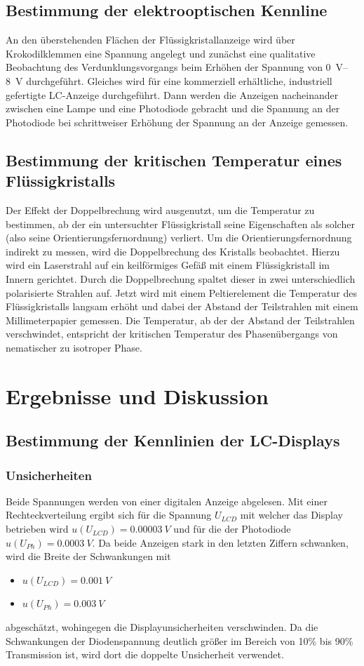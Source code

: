 \documentclass[
	a4paper,
	12pt,
	pagesize,
	ngerman
]{scrartcl}
\begin{document}
	\subsection{Bestimmung der elektrooptischen Kennline}
	An den überstehenden Flächen der Flüssigkristallanzeige wird über Krokodilklemmen eine Spannung angelegt und zunächst eine qualitative Beobachtung des Verdunklungsvorgangs beim Erhöhen der Spannung von \SIrange{0}{8}{V} durchgeführt.
	Gleiches wird für eine kommerziell erhältliche, industriell gefertigte LC-Anzeige durchgeführt.
	Dann werden die Anzeigen nacheinander zwischen eine Lampe und eine Photodiode gebracht und die Spannung an der Photodiode bei schrittweiser Erhöhung der Spannung an der Anzeige gemessen.

	\subsection{Bestimmung der kritischen Temperatur eines Flüssigkristalls}
	Der Effekt der Doppelbrechung wird ausgenutzt, um die Temperatur zu bestimmen, ab der ein untersuchter Flüssigkristall seine Eigenschaften als solcher (also seine Orientierungsfernordnung) verliert.
	Um die Orientierungsfernordnung indirekt zu messen, wird die Doppelbrechung des Kristalls beobachtet.
	Hierzu wird ein Laserstrahl auf ein keilförmiges Gefäß mit einem Flüssigkristall im Innern gerichtet.
	Durch die Doppelbrechung spaltet dieser in zwei unterschiedlich polarisierte Strahlen auf.
	Jetzt wird mit einem Peltierelement die Temperatur des Flüssigkristalls langsam erhöht und dabei der Abstand der Teilstrahlen mit einem Millimeterpapier gemessen.
	Die Temperatur, ab der der Abstand der Teilstrahlen verschwindet, entspricht der kritischen Temperatur des Phasenübergangs von nematischer zu isotroper Phase.

	\section{Ergebnisse und Diskussion}
	\subsection{Bestimmung der Kennlinien der LC-Displays}
	\subsubsection{Unsicherheiten}
	Beide Spannungen werden von einer digitalen Anzeige abgelesen.
	Mit einer Rechteckverteilung ergibt sich für die Spannung $U_{LCD}$ mit welcher das Display betrieben wird $u(U_{LCD})=\SI{0.00003}{V}$ und für die der Photodiode $u(U_{Ph})=\SI{0.0003}{V}$.
	Da beide Anzeigen stark in den letzten Ziffern schwanken, wird die Breite der Schwankungen mit
	\begin{itemize}
		\item $u(U_{LCD})=\SI{0.001}{V}$
		\item $u(U_{Ph})=\SI{0.003}{V}$
	\end{itemize}
	abgeschätzt, wohingegen die Displayunsicherheiten verschwinden.
	Da die Schwankungen der Diodenspannung deutlich größer im Bereich von 10\% bis 90\% Transmission ist, wird dort die doppelte Unsicherheit verwendet.
\end{document}
